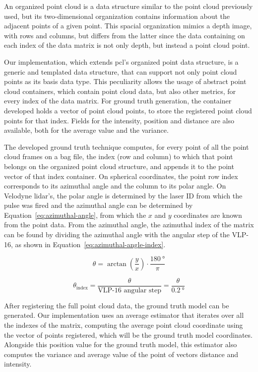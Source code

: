An organized point cloud is a data structure similar to the point cloud previously used, but its two-dimensional organization contains information about the adjacent points of a given point. This spacial organization mimics a depth image, with rows and columns, but differs from the latter since the data containing on each index of the data matrix is not only depth, but instead a point cloud point.

Our implementation, which extends \ac{pcl}'s organized point data structure, is a generic and templated data structure, that can support not only point cloud points as its basis data type. This peculiarity allows the usage of abstract point cloud containers, which contain point cloud data, but also other metrics, for every index of the data matrix. For ground truth generation, the container developed holds a vector of point cloud points, to store the registered point cloud points for that index. Fields for the intensity, position and distance are also available, both for the average value and the variance.

The developed ground truth technique computes, for every point of all the point cloud frames on a bag file, the index (row and column) to which that point belongs on the organized point cloud structure, and appends it to the point vector of that index container. On spherical coordinates, the point row index corresponds to its azimuthal angle and the column to its polar angle. On Velodyne \ac{lidar}'s, the polar angle is determined by the laser ID from which the pulse was fired and the azimuthal angle can be determined by Equation~\eqref{eq:azimuthal-angle}, from which the $x$ and $y$ coordinates are known from the point data. From the azimuthal angle, the azimuthal index of the matrix can be found by dividing the azimuthal angle with the angular step of the VLP-16, as shown in Equation~\eqref{eq:azimuthal-angle-index}.

\begin{equation}
\label{eq:azimuthal-angle}
\theta = \arctan\left(\frac{y}{x}\right) \cdot \frac{\SI{180}{\degree}}{\pi}
\end{equation}

\begin{equation}
\label{eq:azimuthal-angle-index}
\theta_{\text{index}} = \frac{\theta}{\text{VLP-16 angular step}} = \frac{\theta}{\SI{0.2}{\degree}} 
\end{equation}


After registering the full point cloud data, the ground truth model can be generated. Our implementation uses an average estimator that iterates over all the indexes of the matrix, computing the average point cloud coordinate using the vector of points registered, which will be the ground truth model coordinates. Alongside this position value for the ground truth model, this estimator also computes the variance and average value of the point of vectors distance and intensity.



